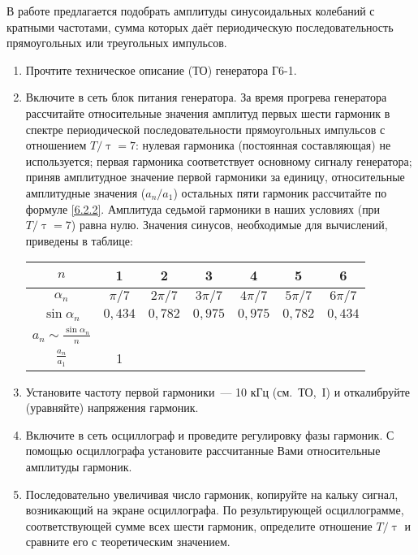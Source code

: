 \begin{lab:task}
	
В работе предлагается подобрать амплитуды синусоидальных колебаний с кратными частотами, сумма которых даёт
периодическую последовательность прямоугольных или треугольных импульсов.


\begin{enumerate}
	\item Прочтите техническое описание (ТО) генератора Г6-1.
	\item\label{task} Включите в сеть блок питания генератора. За время прогрева генератора рассчитайте относительные значения амплитуд первых шести гармоник в спектре периодической последовательности прямоугольных импульсов с отношением $T/\uptau=7$: нулевая гармоника (постоянная составляющая) не используется; первая гармоника соответствует основному сигналу генератора; приняв амплитудное значение первой гармоники за единицу, относительные амплитудные значения ($a_n/a_1$) остальных пяти гармоник рассчитайте по формуле \eqref{6.2.2}. Амплитуда седьмой гармоники в наших условиях (при $T/\uptau=7$) равна нулю. Значения синусов, необходимые для вычислений, приведены в таблице:
	
\begin{center}
\begin{tabular}{|c|c|c|c|c|c|c|} \hline
$n$ & 1 & 2 & 3 & 4 & 5 & 6 \\ \hline $\alpha_n$&$\pi /7$&$2\pi /7$&$3\pi /7$&$4\pi /7$&$5\pi /7$& $6\pi /7$ \\ \hline
$\sin \alpha_n$ & $0{,}434$ & $0{,}782$ & $0{,}975$ & $0{,}975$ &$0{,}782$ & $0{,}434$ \\ \hline $a_n\sim\frac{\sin
\alpha_n}{n}$& & & & & & \\ \hline $\frac{a_n}{a_1}$&1& & & & & \\ \hline
\end{tabular}
\end{center}
	
	\item Установите частоту первой гармоники~--- 10 кГц (см.~ТО,~I) и откалибруйте (уравняйте) напряжения гармоник.
	\item Включите в сеть осциллограф и проведите регулировку фазы гармоник. С помощью осциллографа установите рассчитанные Вами относительные амплитуды гармоник.
	\item Последовательно увеличивая число гармоник, копируйте на кальку сигнал, возникающий на экране осциллографа. По результирующей осциллограмме, соответствующей сумме всех шести гармоник, определите отношение $T/\uptau$ и сравните его с теоретическим значением.
\end{enumerate}


\end{lab:task}
